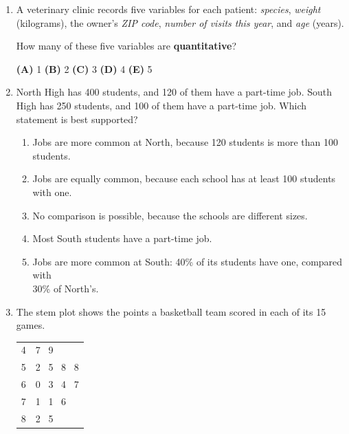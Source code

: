 \documentclass[12pt]{article}
\begin{document}
\begin{enumerate}[leftmargin=1.9em, itemsep=0.13in]

  \boxguard[8]
  \item A veterinary clinic records five variables for each patient: \emph{species},
        \emph{weight} (kilograms), the owner's \emph{ZIP code}, \emph{number of visits this
        year}, and \emph{age} (years).

        How many of these five variables are \textbf{quantitative}?\hfill{}\rule[-0.2in]{0pt}{0.48in}
        \par\vspace{3pt}\noindent
        \hspace{1.2em}\textbf{(A)} 1 \hfill \textbf{(B)} 2 \hfill
        \textbf{(C)} 3 \hfill \textbf{(D)} 4 \hfill \textbf{(E)} 5

  \boxguard[11]
  \item North High has 400 students, and 120 of them have a part-time job. South High has 250
        students, and 100 of them have a part-time job. Which statement is best supported?
        \begin{enumerate}[label=\textbf{(\Alph*)}, leftmargin=2.2em, itemsep=2pt]
          \item Jobs are more common at North, because 120 students is more than 100 students.
          \item Jobs are equally common, because each school has at least 100 students with one.
          \item No comparison is possible, because the schools are different sizes.
          \item Most South students have a part-time job.
          \item Jobs are more common at South: 40\% of its students have one, compared with\\
                30\% of North's.\hfill{}\rule[-0.2in]{0pt}{0.48in}
        \end{enumerate}

  \boxguard[13]
  \item The stem plot shows the points a basketball team scored in each of its 15 games.

        \vspace{3pt}
        {\centering\small
        \renewcommand{\arraystretch}{1.05}
        \begin{tabular}{@{} r | l @{}}
        4 & 7 \ 9 \\
        5 & 2 \ 5 \ 8 \ 8 \\
        6 & 0 \ 3 \ 4 \ 7 \\
        7 & 1 \ 1 \ 6 \\
        8 & 2 \ 5 \\
        \end{tabular}\qquad
        \par}
        \vspace{2pt}


\end{enumerate}
\end{document}
